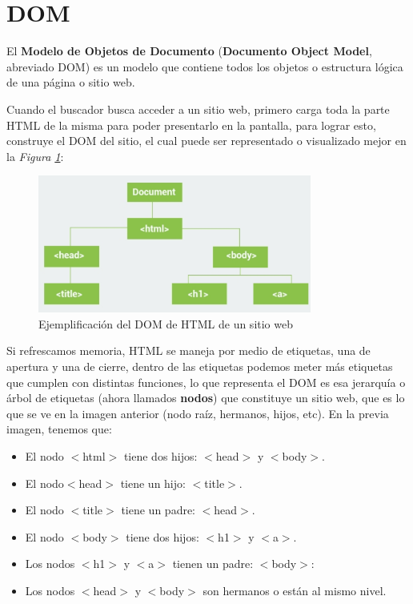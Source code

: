 \section{DOM}
\hspace{0.55cm}El \textbf{Modelo de Objetos de Documento} (\textbf{Documento Object Model}, abreviado DOM) es un modelo que contiene todos los objetos o estructura lógica de una página o sitio web.

Cuando el buscador busca acceder a un sitio web, primero carga toda la parte HTML de la misma para poder presentarlo en la pantalla, para lograr esto, construye el DOM del sitio, el cual puede ser representado o visualizado mejor en la \textit{Figura \ref{fig: 5}}:
\begin{figure}[H]
    \caption{Ejemplificación del DOM de HTML de un sitio web}
    \label{fig: 5}
    \begin{center}
        \includegraphics [width=9cm]{ss/dom_html.png}
    \end{center}
\end{figure}

Si refrescamos memoria, HTML se maneja por medio de etiquetas, una de apertura y una de cierre, dentro de las etiquetas podemos meter más etiquetas que cumplen con distintas funciones, lo que representa el DOM es esa jerarquía o árbol de etiquetas (ahora llamados \textbf{nodos}) que constituye un sitio web, que es lo que se ve en la imagen anterior (nodo raíz, hermanos, hijos, etc). En la previa imagen, tenemos que:
\begin{itemize}
    \item El nodo $<$html$>$ tiene dos hijos: $<$head$>$ y $<$body$>$.
    \item El nodo$<$head$>$ tiene un hijo: $<$title$>$.
    \item El nodo $<$title$>$ tiene un padre: $<$head$>$.
    \item El nodo $<$body$>$ tiene dos hijos: $<$h1$>$ y $<$a$>$.
    \item Los nodos $<$h1$>$ y $<$a$>$ tienen un padre: $<$body$>$:
    \item Los nodos $<$head$>$ y $<$body$>$ son hermanos o están al mismo nivel.
\end{itemize}

